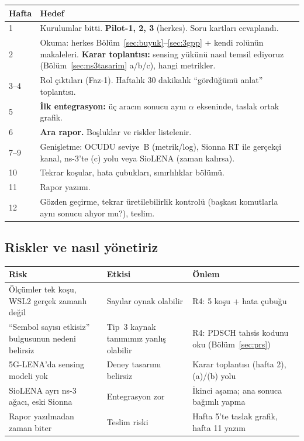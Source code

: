 \begingroup\sffamily\small
\begin{xltabular}{\textwidth}{@{}p{1.3cm}X@{}}
\toprule
\textbf{Hafta} & \textbf{Hedef} \\
 & Kurulumlar bitti. \textbf{Pilot-1, 2, 3} (herkes). Soru kartları cevaplandı. \\
2 & Okuma: herkes Bölüm~\ref{sec:buyuk}--\ref{sec:3gpp} + kendi rolünün makaleleri. \textbf{Karar toplantısı:} sensing yükünü nasıl temsil ediyoruz (Bölüm~\ref{sec:ns3tasarim} a/b/c), hangi metrikler. \\
3--4 & Rol çıktıları (Faz-1). Haftalık 30 dakikalık ``gördüğümü anlat'' toplantısı. \\
5 & \textbf{İlk entegrasyon:} üç aracın sonucu aynı $\alpha$ ekseninde, taslak ortak grafik. \\
6 & \textbf{Ara rapor.} Boşluklar ve riskler listelenir. \\
7--9 & Genişletme: OCUDU seviye~B (metrik/log), Sionna RT ile gerçekçi kanal, ns-3'te (c) yolu veya SioLENA (zaman kalırsa). \\
10 & Tekrar koşular, hata çubukları, sınırlılıklar bölümü. \\
11 & Rapor yazımı. \\
12 & Gözden geçirme, tekrar üretilebilirlik kontrolü (başkası komutlarla aynı sonucu alıyor mu?), teslim. \\
\bottomrule
\end{xltabular}
\endgroup

\subsection{Riskler ve nasıl yönetiriz}

\begingroup\sffamily\small
\begin{xltabular}{\textwidth}{@{}p{4.4cm}Xp{3.6cm}@{}}
\toprule
\textbf{Risk} & \textbf{Etkisi} & \textbf{Önlem} \\
\midrule
Ölçümler tek koşu, WSL2 gerçek zamanlı değil & Sayılar oynak olabilir & R4: 5 koşu + hata çubuğu \\
``Sembol sayısı etkisiz'' bulgusunun nedeni belirsiz & Tip~3 kaynak tanımımız yanlış olabilir & R4: PDSCH tahsis kodunu oku (Bölüm~\ref{sec:prs}) \\
5G-LENA'da sensing modeli yok & Deney tasarımı belirsiz & Karar toplantısı (hafta 2), (a)/(b) yolu \\
SioLENA ayrı ns-3 ağacı, eski Sionna & Entegrasyon zor & İkinci aşama; ana sonuca bağımlı yapma \\
Rapor yazılmadan zaman biter & Teslim riski & Hafta 5'te taslak grafik, hafta 11 yazım \\
\bottomrule
\end{xltabular}
\endgroup
